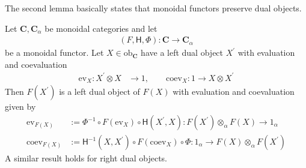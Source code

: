 The second lemma basically states that monoidal functors preserve dual objects.
\\
\begin{lem}
\label{lem:mfduals}
Let $\mathbf{C},\mathbf{C}_{\alpha}$ be monoidal categories and let
\begin{align*}
  (F,\mathsf{H},\Phi)
  \colon
  \mathbf{C}
  \to
  \mathbf{C}_{\alpha}
\end{align*}
be a monoidal functor. Let $X \in \mathrm{ob}_{\mathbf{C}}$ have a left dual object $X^{\prime}$ with evaluation and coevaluation
\begin{align*}
  \mathrm{ev}_{X}
  \colon
  X^{\prime}
  \otimes
  X
  &\to
  1
  ,\qquad
  \mathrm{coev}_{X}
  \colon
  1
  \to
  X
  \otimes
  X^{\prime}
\end{align*}
Then $F(X^{\prime})$ is a left dual object of $F(X)$ with evaluation and coevaluation given by
\begin{align*}
  \mathrm{ev}_{F(X)}
  &:=
  \Phi^{-1}
  \circ
  F(\mathrm{ev}_{X})
  \circ
  \mathsf{H}(X^{\prime},X)
  \colon
  F(X^{\prime})
  \otimes_{\alpha}
  F(X)
  \to
  1_{\alpha}
  \\
  \mathrm{coev}_{F(X)}
  &:=
  \mathsf{H}^{-1}(X,X^{\prime})
  \circ
  F(\mathrm{coev}_{X})
  \circ
  \Phi
  \colon
  1_{\alpha}
  \to
  F(X)
  \otimes_{\alpha}
  F(X^{\prime})
\end{align*}
A similar result holds for right dual objects.
\end{lem}
